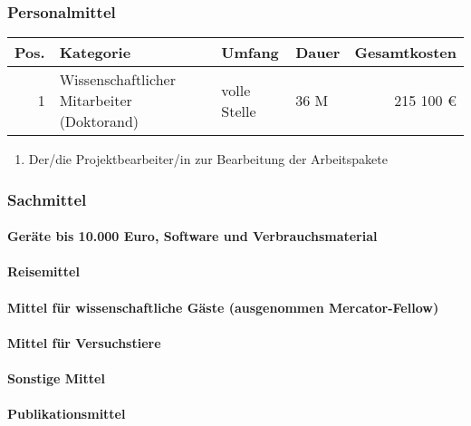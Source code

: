 \documentclass[de]{dfg-proposal}
\begin{document}
\subsubsection{Personalmittel}

\begin{tabularx}{\linewidth}{rXllr}
    \toprule
    Pos. & Kategorie                                  & Umfang       & Dauer & Gesamtkosten \\
    \midrule
    1    & Wissenschaftlicher Mitarbeiter (Doktorand) & volle Stelle & 36 M  & 215 100 €    \\
    \bottomrule
\end{tabularx}

\begin{enumerate}
    \item Der/die Projektbearbeiter/in zur Bearbeitung der Arbeitspakete
\end{enumerate}

\subsubsection{Sachmittel}

\paragraph{Geräte bis 10.000 Euro, Software und Verbrauchsmaterial}

\paragraph{Reisemittel}

\paragraph{Mittel für wissenschaftliche Gäste (ausgenommen Mercator-Fellow)}

\paragraph{Mittel für Versuchstiere}

\paragraph{Sonstige Mittel}

\paragraph{Publikationsmittel}
\end{document}
